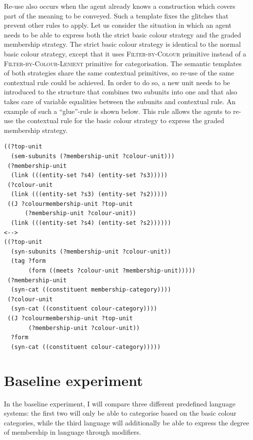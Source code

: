 Re-use also occurs when the agent already knows a construction which
covers part of the meaning to be conveyed. Such a template fixes the
glitches that prevent other rules to apply. Let us consider the
situation in which an agent needs to be able to express both the
strict basic colour strategy and the graded membership
  strategy. The strict basic colour strategy is identical to the
normal basic colour strategy, except that it uses
\textsc{Filter-by-Colour} primitive instead of a
\textsc{Filter-by-Colour-Lenient} primitive for categorisation.  The
semantic templates of both strategies share the same contextual
primitives, so re-use of the same contextual rule could be achieved. In
order to do so, a new unit needs to be introduced to the structure
that combines two subunits into one and that also takes care of
variable equalities between the subunits and contextual rule. An
example of such a ``glue''-rule is shown below. This rule allows the
agents to re-use the contextual rule for the basic colour
  strategy to express the graded membership strategy.

\footnotesize
{}
\begin{lstlisting}
((?top-unit 
  (sem-subunits (?membership-unit ?colour-unit)))
 (?membership-unit 
  (link (((entity-set ?s4) (entity-set ?s3)))))
 (?colour-unit 
  (link (((entity-set ?s3) (entity-set ?s2)))))
 ((J ?colourmembership-unit ?top-unit 
      (?membership-unit ?colour-unit))
  (link (((entity-set ?s4) (entity-set ?s2))))))
<-->
((?top-unit
  (syn-subunits (?membership-unit ?colour-unit))
  (tag ?form 
       (form ((meets ?colour-unit ?membership-unit)))))
 (?membership-unit
  (syn-cat ((constituent membership-category))))
 (?colour-unit 
  (syn-cat ((constituent colour-category))))
 ((J ?colourmembership-unit ?top-unit 
       (?membership-unit ?colour-unit))
  ?form
  (syn-cat ((constituent colour-category)))))
\end{lstlisting}
\normalsize


\section{Baseline experiment}
\label{s:gms-baseline-experiment}

In the baseline experiment, I will compare three different predefined language
systems: the first two will only be able to categorise based on the
basic colour categories, while the third language will additionally be
able to express the degree of membership in language through
modifiers.

